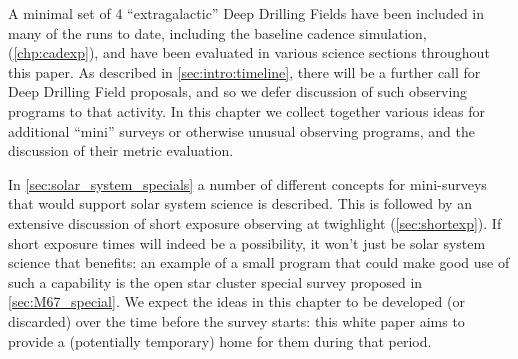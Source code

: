 A minimal set of 4 ``extragalactic'' Deep Drilling Fields have been
included in many of the \OpSim runs to date, including the baseline cadence simulation,  (\autoref{chp:cadexp}), and have
been evaluated in various science sections throughout this paper.
As described in \autoref{sec:intro:timeline}, there will be a further call for Deep Drilling Field proposals, and so we defer discussion of such observing programs to that activity. In this chapter we collect together various ideas for additional ``mini'' surveys or otherwise unusual observing programs, and the discussion of their metric evaluation.

In \autoref{sec:solar_system_specials} a number of different concepts for mini-surveys that would support solar system science is described. This is followed by an extensive discussion of short exposure observing at twighlight (\autoref{sec:shortexp}). If short exposure times will indeed be a possibility, it won't just be solar system science that benefits: an example of a small program that could make good use of such a capability is the open star cluster special survey proposed in \autoref{sec:M67_special}. We expect the ideas in this chapter to be developed (or discarded) over the time before the survey starts: this white paper aims to provide a (potentially temporary) home for them during that period.




% 


% 










